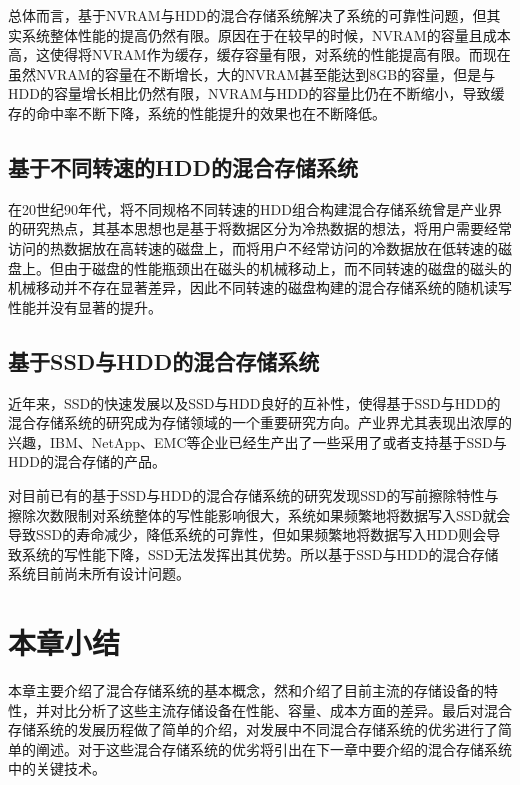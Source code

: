 总体而言，基于NVRAM与HDD的混合存储系统解决了系统的可靠性问题，但其实系统整体性能的提高仍然有限。原因在于在较早的时候，NVRAM的容量且成本高，这使得将NVRAM作为缓存，缓存容量有限，对系统的性能提高有限。而现在虽然NVRAM的容量在不断增长，大的NVRAM甚至能达到8GB的容量，但是与HDD的容量增长相比仍然有限，NVRAM与HDD的容量比仍在不断缩小，导致缓存的命中率不断下降，系统的性能提升的效果也在不断降低。

\subsection{基于不同转速的HDD的混合存储系统}

在20世纪90年代，将不同规格不同转速的HDD组合构建混合存储系统曾是产业界的研究热点，其基本思想也是基于将数据区分为冷热数据的想法，将用户需要经常访问的热数据放在高转速的磁盘上，而将用户不经常访问的冷数据放在低转速的磁盘上。但由于磁盘的性能瓶颈出在磁头的机械移动上，而不同转速的磁盘的磁头的机械移动并不存在显著差异，因此不同转速的磁盘构建的混合存储系统的随机读写性能并没有显著的提升。

\subsection{基于SSD与HDD的混合存储系统}

近年来，SSD的快速发展以及SSD与HDD良好的互补性，使得基于SSD与HDD的混合存储系统的研究成为存储领域的一个重要研究方向。产业界尤其表现出浓厚的兴趣，IBM、NetApp、EMC等企业已经生产出了一些采用了或者支持基于SSD与HDD的混合存储的产品。

对目前已有的基于SSD与HDD的混合存储系统的研究发现SSD的写前擦除特性与擦除次数限制对系统整体的写性能影响很大，系统如果频繁地将数据写入SSD就会导致SSD的寿命减少，降低系统的可靠性，但如果频繁地将数据写入HDD则会导致系统的写性能下降，SSD无法发挥出其优势。所以基于SSD与HDD的混合存储系统目前尚未所有设计问题。

\section{本章小结}

本章主要介绍了混合存储系统的基本概念，然和介绍了目前主流的存储设备的特性，并对比分析了这些主流存储设备在性能、容量、成本方面的差异。最后对混合存储系统的发展历程做了简单的介绍，对发展中不同混合存储系统的优劣进行了简单的阐述。对于这些混合存储系统的优劣将引出在下一章中要介绍的混合存储系统中的关键技术。